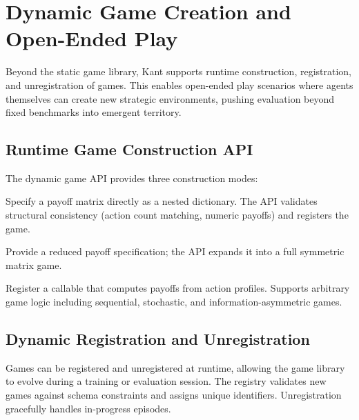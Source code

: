 
\section{Dynamic Game Creation and Open-Ended Play}
\label{sec:dynamic}

Beyond the static game library, Kant supports runtime construction,
registration, and unregistration of games. This enables open-ended play
scenarios where agents themselves can create new strategic environments,
pushing evaluation beyond fixed benchmarks into emergent territory.


\subsection{Runtime Game Construction API}
\label{sec:game-api}

The dynamic game API provides three construction modes:

\begin{description}[nosep]
    \item[Matrix Construction.] Specify a payoff matrix directly as a nested
        dictionary. The API validates structural consistency (action count
        matching, numeric payoffs) and registers the game.
    \item[Symmetric Construction.] Provide a reduced payoff specification;
        the API expands it into a full symmetric matrix game.
    \item[Custom Payoff Function.] Register a callable that computes payoffs
        from action profiles. Supports arbitrary game logic including
        sequential, stochastic, and information-asymmetric games.
\end{description}


\subsection{Dynamic Registration and Unregistration}
\label{sec:registration}

Games can be registered and unregistered at runtime, allowing the game library
to evolve during a training or evaluation session. The registry validates new
games against schema constraints and assigns unique identifiers. Unregistration
gracefully handles in-progress episodes.

